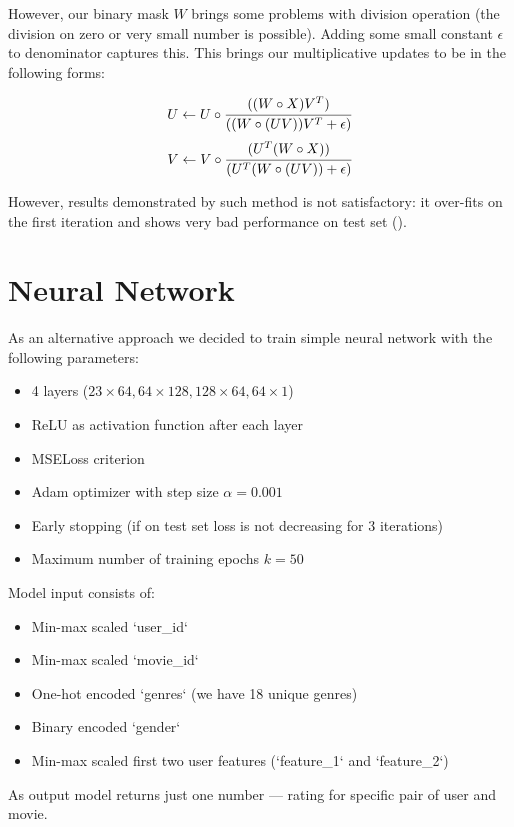 \documentclass{article}
\begin{document}
However, our binary mask $W$ brings some problems with division operation (the division on zero or very small number is possible). Adding some small constant $\epsilon$ to denominator captures this. This brings our multiplicative updates to be in the following forms:

\begin{equation}
  U \gets U \circ \cfrac{((W \circ X) V^T)}{((W \circ (UV)) V^T + \epsilon)}
\end{equation}
\begin{equation}
  V \gets V \circ \cfrac{(U^T (W \circ X))}{(U^T (W \circ (UV)) + \epsilon)}
\end{equation}

However, results demonstrated by such method is not satisfactory: it over-fits on the first iteration and shows very bad performance on test set ().

\section{Neural Network}\label{sec:NN}
As an alternative approach we decided to train simple neural network with the following parameters:
\begin{itemize}
  \item 4 layers ($23\times64, 64\times128, 128\times64, 64\times1$)
  \item ReLU as activation function after each layer
  \item MSELoss criterion
  \item Adam optimizer with step size $\alpha = 0.001$
  \item Early stopping (if on test set loss is not decreasing for 3 iterations)
  \item Maximum number of training epochs $k= 50$
\end{itemize}

Model input consists of:
\begin{itemize}
  \item Min-max scaled `user\_id`
  \item Min-max scaled `movie\_id`
  \item One-hot encoded `genres` (we have 18 unique genres)
  \item Binary encoded `gender`
  \item Min-max scaled first two user features (`feature\_1` and `feature\_2`)
\end{itemize}

As output model returns just one number --- rating for specific pair of user and movie.
\end{document}
